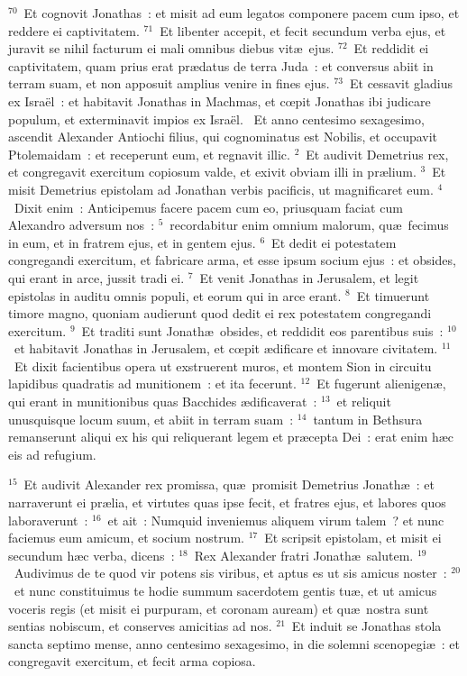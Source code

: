 ${}^{70}$~Et cognovit Jonathas~: et misit ad eum legatos componere pacem cum ipso, et reddere ei captivitatem.
${}^{71}$~Et libenter accepit, et fecit secundum verba ejus, et juravit se nihil facturum ei mali omnibus diebus vit\ae\ ejus.
${}^{72}$~Et reddidit ei captivitatem, quam prius erat pr\ae datus de terra Juda~: et conversus abiit in terram suam, et non apposuit amplius venire in fines ejus.
${}^{73}$~Et cessavit gladius ex Isra\"el~: et habitavit Jonathas in Machmas, et cœpit Jonathas ibi judicare populum, et exterminavit impios ex Isra\"el.
~\lettrine[lines=10,image=true,loversize=0.05,lraise=-0.03]{E}{}t anno centesimo sexagesimo, ascendit Alexander Antiochi filius, qui cognominatus est Nobilis, et occupavit Ptolemaidam~: et receperunt eum, et regnavit illic.
${}^{2}$~Et audivit Demetrius rex, et congregavit exercitum copiosum valde, et exivit obviam illi in pr\ae lium.
${}^{3}$~Et misit Demetrius epistolam ad Jonathan verbis pacificis, ut magnificaret eum.
${}^{4}$~Dixit enim~: Anticipemus facere pacem cum eo, priusquam faciat cum Alexandro adversum nos~:
${}^{5}$~recordabitur enim omnium malorum, qu\ae\ fecimus in eum, et in fratrem ejus, et in gentem ejus.
${}^{6}$~Et dedit ei potestatem congregandi exercitum, et fabricare arma, et esse ipsum socium ejus~: et obsides, qui erant in arce, jussit tradi ei.
${}^{7}$~Et venit Jonathas in Jerusalem, et legit epistolas in auditu omnis populi, et eorum qui in arce erant.
${}^{8}$~Et timuerunt timore magno, quoniam audierunt quod dedit ei rex potestatem congregandi exercitum.
${}^{9}$~Et traditi sunt Jonath\ae\ obsides, et reddidit eos parentibus suis~:
${}^{10}$~et habitavit Jonathas in Jerusalem, et cœpit \ae dificare et innovare civitatem.
${}^{11}$~Et dixit facientibus opera ut exstruerent muros, et montem Sion in circuitu lapidibus quadratis ad munitionem~: et ita fecerunt.
${}^{12}$~Et fugerunt alienigen\ae , qui erant in munitionibus quas Bacchides \ae dificaverat~:
${}^{13}$~et reliquit unusquisque locum suum, et abiit in terram suam~:
${}^{14}$~tantum in Bethsura remanserunt aliqui ex his qui reliquerant legem et pr\ae cepta Dei~: erat enim h\ae c eis ad refugium.


${}^{15}$~Et audivit Alexander rex promissa, qu\ae\ promisit Demetrius Jonath\ae~: et narraverunt ei pr\ae lia, et virtutes quas ipse fecit, et fratres ejus, et labores quos laboraverunt~:
${}^{16}$~et ait~: Numquid inveniemus aliquem virum talem~? et nunc faciemus eum amicum, et socium nostrum.
${}^{17}$~Et scripsit epistolam, et misit ei secundum h\ae c verba, dicens~:
${}^{18}$~Rex Alexander fratri Jonath\ae\ salutem.
${}^{19}$~Audivimus de te quod vir potens sis viribus, et aptus es ut sis amicus noster~:
${}^{20}$~et nunc constituimus te hodie summum sacerdotem gentis tu\ae , et ut amicus voceris regis (et misit ei purpuram, et coronam auream) et qu\ae\ nostra sunt sentias nobiscum, et conserves amicitias ad nos.
${}^{21}$~Et induit se Jonathas stola sancta septimo mense, anno centesimo sexagesimo, in die solemni scenopegi\ae~: et congregavit exercitum, et fecit arma copiosa.


